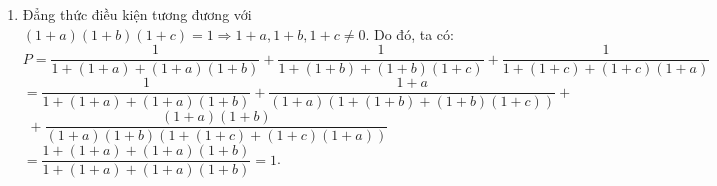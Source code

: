 \begin{ex}
{\begin{enumerate} [\bf 1)]
\begin{enumerate}[a)]
						Nếu $3x-3\ne 0\Leftrightarrow $ $x\ne 1$\\
						Vì $x\in Z$ nên $\hoac{& \sqrt{3x}-2\in \mathbb{Z} \\ & \sqrt{3x}-2\in \mathbb{I}}$
						\begin{itemize}
							\item Nếu $\sqrt{3x}-2\in \mathbb{I}$ thì $A\in \mathbb{I}$ (Vô lý).
							\item Nếu $\sqrt{3x}-2\in \mathbb{Z}$ thì $B=\sqrt{3x}+2+\dfrac{1}{\sqrt{3x}-2}$
						\end{itemize}
						Do đó $B\in \mathbb{Z}$ khi và chỉ khi $\sqrt{3x}-2\in \left\{-1;1\right\}$, từ đó tìm được $x=3$ thỏa mãn yêu  cầu.\\
						Vậy $x\in \left\{1;3\right\}$.
			\end{enumerate}
	\item Đẳng thức điều kiện tương đương với $\left(1+a\right)\left(1+b\right)\left(1+c\right)=1\Rightarrow 1+a,  1+b,  1+c\ne 0$. Do đó, ta có:\\
			$P= \dfrac{1}{1+(1+a)+(1+a)(1+b)}+\dfrac{1}{1+(1+b)+(1+b)(1+c)}+\dfrac{1}{1+(1+c)+(1+c)(1+a)}$
			\phantom{$P$ }$= \dfrac{1}{1+(1+a)+(1+a)(1+b)}+\dfrac{1+a}{(1+a)\left(1+(1+b)+(1+b)(1+c)\right)}+$\\
			\phantom{$P=$ }$ \,\,+\dfrac{(1+a)(1+b)}{(1+a)(1+b)\left(1+(1+c)+(1+c)(1+a)\right)}$\\
			\phantom{$P$ }$= \dfrac{1+(1+a)+(1+a)(1+b)}{1+(1+a)+(1+a)(1+b)}=1$. 
\end{enumerate}
}
\end{ex}

